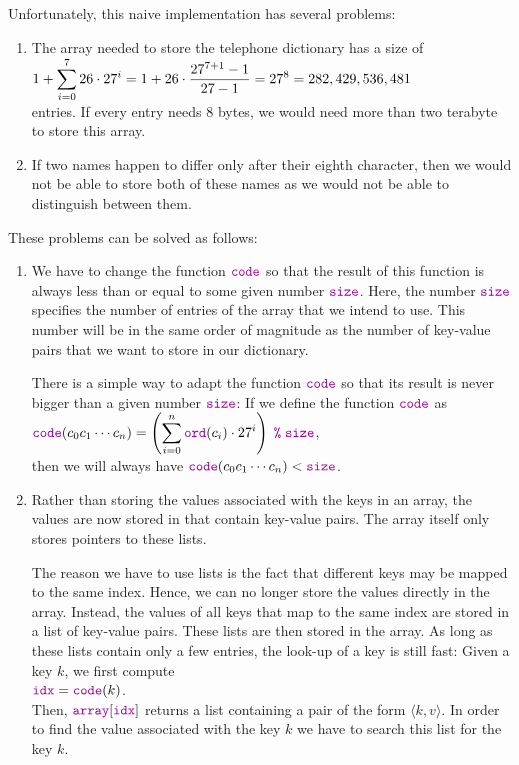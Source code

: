 \noindent
Unfortunately, this naive implementation has several problems: 
\begin{enumerate}
\item The array needed to store the telephone dictionary has a size of 
      \\[0.2cm]
      \hspace*{1.3cm}
      $\displaystyle 1 + \sum\limits_{i=0}^7 26 \cdot 27^i = 1 + 26 \cdot \frac{27^{7+1} - 1}{27 - 1} = 27^8 = 282,429,536,481$ 
      \\[0.2cm]
      entries.  If every entry needs 8 bytes, we would need more than two terabyte to store this array.
\item If two names happen to differ only after their eighth character, then we would not be able to
      store both of these names as we would not be able to distinguish between them.
\end{enumerate}
These problems can be solved as follows:
\begin{enumerate}
\item We have to change the function  $\mytt{code}$ so that the result of this function is always
      less than or equal to some given number $\mytt{size}$.  Here, the number $\mytt{size}$ specifies
      the number of entries of the array that we intend to use.  This number will be in the same
      order of magnitude as the number of key-value pairs that we want to store in our dictionary.

      There is a simple way to adapt the function  $\mytt{code}$ so that its result is never bigger
      than a given number $\mytt{size}$: If we define the function $\mytt{code}$ as
      \\[0.2cm]
      \hspace*{1.3cm} 
      $\ds\mytt{code}(c_0c_1\cdots c_n) = \left(\sum\limits_{i=0}^n \mytt{ord}(c_i) \cdot
        27^i\right) \;\mytt{\%}\; \mytt{size}$,
      \\[0.2cm]
      then we will always have $\mytt{code}(c_0c_1\cdots c_n) < \mytt{size}$.  
\item Rather than storing the values associated with the keys in an array, the values are now stored
      in  that contain key-value pairs.  The array itself only stores pointers to these
       lists. 
      
      The reason we have to use lists is the fact that different keys may be mapped to the
      same index.  Hence, we can no longer store the values directly in the array.  Instead,
      the values of all keys that map to the same index are stored in a
      list of key-value pairs.  These  lists are then stored in the array.  As long as
      these lists contain only a few entries, the look-up of a key is still fast: Given a key $k$,
      we first compute 
      \\[0.2cm]
      \hspace*{1.3cm}
      $\mytt{idx} = \mytt{code}(k)$.
      \\[0.2cm]
      Then, $\mytt{array}[\mytt{idx}]$ returns a list containing a pair of the form $\langle k, v \rangle$.
      In order to find the value associated with the key $k$ we have to search this list for the key
      $k$.
\end{enumerate}

